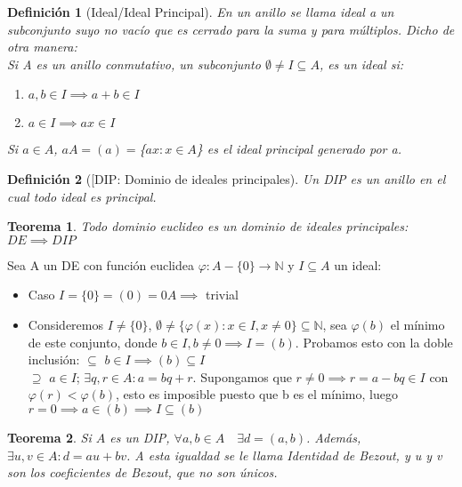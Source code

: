 \documentclass[11pt, a4paper, titlepage]{article}
\makeatletter
\renewenvironment{proof}[1][\proofname] {\vspace{-15pt}\par\pushQED{\qed}\normalfont\topsep6\p@\@plus6\p@\relax\trivlist\item[\hskip\labelsep\it#1\@addpunct{.}]\ignorespaces}{\popQED\endtrivlist\@endpefalse}
\theoremstyle{theorem-style}
\newtheorem*{nth}{Teorema}
\theoremstyle{definition-style}
\newtheorem*{ndef}{Definición}
\theoremstyle{remark-style}
\theoremstyle{example-style}
\newenvironment{nlist}
{\begin{enumerate}
\renewcommand\labelenumi{(\emph{\roman{enumi})}}}
{\end{enumerate}}
\makeatother
\begin{document}
\begin{ndef}[Ideal/Ideal Principal]
	En un anillo se llama ideal a un subconjunto suyo no vacío que es cerrado para la suma y para múltiplos. Dicho de otra manera: \\
	Si A es un anillo conmutativo, un subconjunto $\emptyset \not= I\subseteq A$, es un ideal si:
	\begin{nlist}
		\item $a,b\in I \implies a+b\in I$
		\item $a\in I \implies ax \in I$
	\end{nlist}
	Si $a\in A$, $aA=(a)=$\{$ax: x\in A$\} es el ideal principal generado por a.
\end{ndef}


\begin{ndef}[[DIP: Dominio de ideales principales]
	Un DIP es un anillo en el cual todo ideal es principal.
\end{ndef}
\begin{nth}
	Todo dominio euclideo es un dominio de ideales principales: $DE \implies DIP$
\end{nth}
\begin{proof}
	Sea A un DE con función euclidea $\varphi: A-\{ 0 \} \longrightarrow \mathbb{N}$ y $I\subseteq A$ un ideal:
	\begin{itemize}
		\item Caso $I=\{ 0 \} = (0)= 0A \implies $ trivial
		\item Consideremos $I\neq \{ 0\}$, $\emptyset \neq \{ \varphi (x): x\in I, x\neq 0\} \subseteq \mathbb{N}$, sea $\varphi (b)$ el mínimo de este conjunto, donde $b\in I, b\neq 0 \implies I=(b)$. Probamos esto con la doble inclusión:
		$\boxed{\subseteq}$ $b\in I \implies (b)\subseteq I$ \\
		$\boxed{\supseteq}$ $a\in I$; $\exists q,r\in A: a=bq+r$. Supongamos que $r\neq 0 \implies r=a-bq\in I$ con $\varphi (r) < \varphi (b)$, esto es imposible puesto que b es el mínimo, luego $r=0 \implies a\in (b) \implies I\subseteq (b)$
	\end{itemize}
\end{proof}


\begin{nth}
	Si $A$ es un DIP, $\forall a,b \in A \quad \exists d = (a,b)$. Además, $\exists u,v \in A : d = au+bv$. A esta igualdad se le llama Identidad de Bezout, y u y v son los coeficientes de Bezout, que no son únicos.
	
\end{nth}
\end{document}
